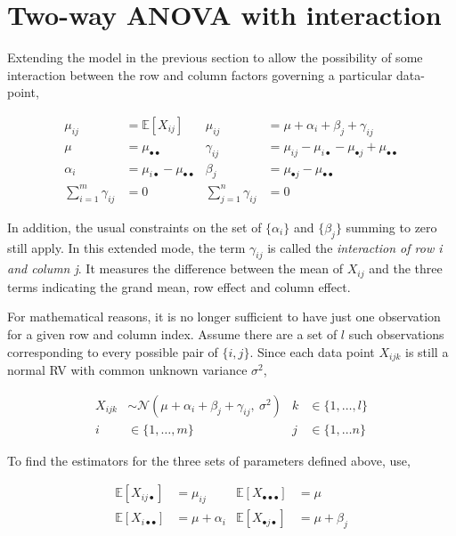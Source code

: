 \section{Two-way ANOVA with interaction} 

Extending the model in the previous section to allow the possibility of some interaction between the row and column factors governing a particular data-point,

\begin{align}
	\mu_{ij} &= \mathbb{E}[X_{ij}] & \mu_{ij} &= \mu + \alpha_i + \beta_j + \gamma_{ij} \\
	\mu &= \mu_{\bullet \bullet} & \gamma_{ij} &= \mu_{ij} - \mu_{i\bullet} - \mu_{\bullet j} + \mu_{\bullet \bullet} \\
	\alpha_i &= \mu_{i\bullet} - \mu_{\bullet \bullet} & \beta_j &= \mu_{\bullet j} - \mu_{\bullet \bullet} \\
	\sum\limits_{i = 1}^{m} \gamma_{ij} &= 0 & \sum\limits_{j = 1}^{n} \gamma_{ij} &= 0
\end{align}

In addition, the usual constraints on the set of $ \{\alpha_i\} $ and $ \{\beta_j\} $ summing to zero still apply. In this extended mode, the term $ \gamma_{ij} $ is called the \textit{interaction of row i and column j}. It measures the difference between the mean of $ X_{ij} $ and the three terms indicating the grand mean, row effect and column effect.

For mathematical reasons, it is no longer sufficient to have just one observation for a given row and column index. Assume there are a set of $ l $ such observations corresponding to every possible pair of $ \{i, j\} $. Since each data point $ X_{ijk} $ is still a normal RV with common unknown variance $ \sigma^2 $,

\begin{align}
	X_{ijk} &\sim \mathcal{N}(\mu + \alpha_i + \beta_j + \gamma_{ij},\ \sigma^2) & k &\in \{1, \dots, l\} \\
	i &\in \{1, \dots, m\} & j &\in \{1, \dots n\} \nonumber 
\end{align}

To find the estimators for the three sets of parameters defined above, use,

\begin{align}
	\mathbb{E}[X_{ij\bullet}] &= \mu_{ij} & \mathbb{E}[X_{\bullet \bullet \bullet}] &= \mu \\
	\mathbb{E}[X_{i\bullet \bullet}] &= \mu + \alpha_i & \mathbb{E}[X_{\bullet j \bullet}] &= \mu + \beta_j
\end{align}

